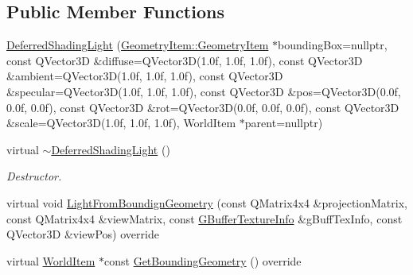 \subsection*{Public Member Functions}
\begin{DoxyCompactItemize}
\item 
\mbox{\hyperlink{class_geometry_engine_1_1_geometry_world_item_1_1_geometry_light_1_1_deferred_shading_light_ac5d6155ce4539820a6e93a733a67fb3f}{Deferred\+Shading\+Light}} (\mbox{\hyperlink{class_geometry_engine_1_1_geometry_world_item_1_1_geometry_item_1_1_geometry_item}{Geometry\+Item\+::\+Geometry\+Item}} $\ast$bounding\+Box=nullptr, const Q\+Vector3D \&diffuse=Q\+Vector3D(1.\+0f, 1.\+0f, 1.\+0f), const Q\+Vector3\+D \&ambient=\+Q\+Vector3\+D(1.\+0f, 1.\+0f, 1.\+0f), const Q\+Vector3\+D \&specular=\+Q\+Vector3\+D(1.\+0f, 1.\+0f, 1.\+0f), const Q\+Vector3\+D \&pos=\+Q\+Vector3\+D(0.\+0f, 0.\+0f, 0.\+0f), const Q\+Vector3\+D \&rot=\+Q\+Vector3\+D(0.\+0f, 0.\+0f, 0.\+0f), const Q\+Vector3\+D \&scale=\+Q\+Vector3\+D(1.\+0f, 1.\+0f, 1.\+0f), World\+Item $\ast$parent=nullptr)
\item 
\mbox{\label{class_geometry_engine_1_1_geometry_world_item_1_1_geometry_light_1_1_deferred_shading_light_ae192a09794050997ecdd669bbd2888ba}} 
virtual \mbox{\hyperlink{class_geometry_engine_1_1_geometry_world_item_1_1_geometry_light_1_1_deferred_shading_light_ae192a09794050997ecdd669bbd2888ba}{$\sim$\+Deferred\+Shading\+Light}} ()
\begin{DoxyCompactList}\small\item\em Destructor. \end{DoxyCompactList}\item 
virtual void \mbox{\hyperlink{class_geometry_engine_1_1_geometry_world_item_1_1_geometry_light_1_1_deferred_shading_light_a2071d92505a56dfb846b87c2aca9b94b}{Light\+From\+Boundign\+Geometry}} (const Q\+Matrix4x4 \&projection\+Matrix, const Q\+Matrix4x4 \&view\+Matrix, const \mbox{\hyperlink{struct_geometry_engine_1_1_g_buffer_texture_info}{G\+Buffer\+Texture\+Info}} \&g\+Buff\+Tex\+Info, const Q\+Vector3D \&view\+Pos) override
\item 
virtual \mbox{\hyperlink{class_geometry_engine_1_1_geometry_world_item_1_1_world_item}{World\+Item}} $\ast$const \mbox{\hyperlink{class_geometry_engine_1_1_geometry_world_item_1_1_geometry_light_1_1_deferred_shading_light_a742416954d3b05484799e4c1235567b1}{Get\+Bounding\+Geometry}} () override
\end{DoxyCompactItemize}

